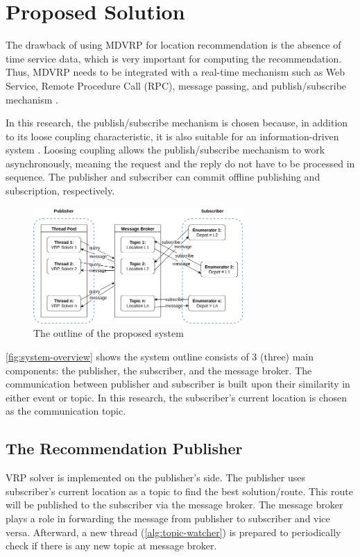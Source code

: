\documentclass[conference]{IEEEtran}
\begin{document}
\section{Proposed Solution}
\label{sec:proposed-solution}
The drawback of using MDVRP for location recommendation is the absence of time service data, which is very important for computing the recommendation. Thus, MDVRP needs to be integrated with a real-time mechanism such as Web Service, Remote Procedure Call (RPC), message passing, and publish/subscribe mechanism \cite{eugster_many_2003}.

In this research, the publish/subscribe mechanism is chosen because, in addition to its loose coupling characteristic, it is also suitable for an information-driven system \cite{muhl_large-scale_2002}. Loosing coupling allows the publish/subscribe mechanism to work asynchronously, meaning the request and the reply do not have to be processed in sequence. The publisher and subscriber can commit offline publishing and subscription, respectively. 


\begin{figure}[!]
	\centering
	\includegraphics[width=8cm]{Resources/Images/system-overview}
	\caption{The outline of the proposed system}
	\label{fig:system-overview}
\end{figure}


\autoref{fig:system-overview} shows the system outline consists of 3 (three) main components: the publisher, the subscriber, and the message broker. The communication between publisher and subscriber is built upon their similarity in either event or topic. In this research, the subscriber's current location is chosen as the communication topic. 


\subsection{The Recommendation Publisher}
\label{ssec:recommendation-publisher}
VRP solver is implemented on the publisher's side. The publisher uses subscriber's current location as a topic to find the best solution/route. This route will be published to the subscriber via the message broker. The message broker plays a role in forwarding the message from publisher to subscriber and vice versa. Afterward, a new thread (\autoref{alg:topic-watcher}) is prepared to periodically check if there is any new topic at message broker. 
\end{document}
